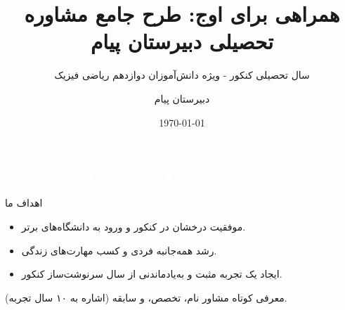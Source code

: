 \documentclass[aspectratio=169]{beamer}
\title{همراهی برای اوج: طرح جامع مشاوره تحصیلی دبیرستان پیام}
\subtitle{سال تحصیلی کنکور - ویژه دانش‌آموزان دوازدهم ریاضی فیزیک}
\author{دبیرستان پیام} %
\institute{مشاوره تحصیلی دبیرستان پیام}
\date{\today} %
\begin{document}
\begin{frame}[plain] %
  \titlepage
\end{frame}

\begin{frame}
  \frametitle{\textcolor{white}{\textbf{چرا اینجا هستیم؟ هدف مشترک ما}}}

  \begin{block}{اهداف ما}
    \begin{itemize}
      \item موفقیت درخشان در کنکور و ورود به دانشگاه‌های برتر.
      \item رشد همه‌جانبه فردی و کسب مهارت‌های زندگی.
      \item ایجاد یک تجربه مثبت و به‌یادماندنی از سال سرنوشت‌ساز کنکور.
    \end{itemize}
  \end{block}

  \begin{alertblock}{معرفی کوتاه مشاور}
    نام، تخصص، و سابقه (اشاره به ۱۰ سال تجربه).
  \end{alertblock}
\end{frame}
\end{document}
